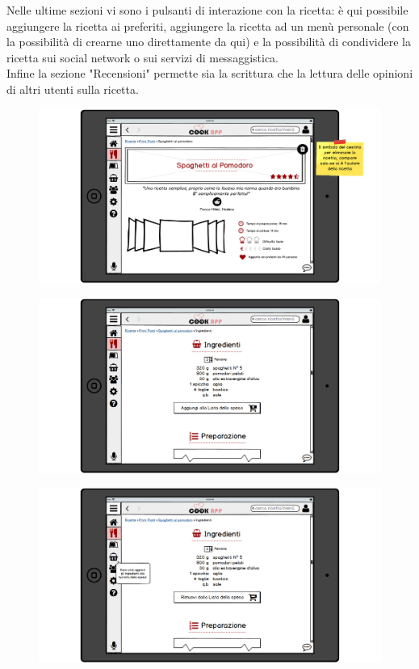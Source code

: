 Nelle ultime sezioni vi sono i pulsanti di interazione con la ricetta: è qui possibile aggiungere la ricetta ai preferiti, aggiungere la ricetta ad un menù personale (con la possibilità di crearne uno direttamente da qui) e la possibilità di condividere la ricetta sui social network o sui servizi di messaggistica.\\
Infine la sezione "Recensioni" permette sia la scrittura che la lettura delle opinioni di altri utenti sulla ricetta.\\
\begin{figure}[H]
	\centering
	\includegraphics[width=0.95\linewidth]{img/mockup/Ricetta.png}
\end{figure}
\begin{figure}[H]
	\centering
	\includegraphics[width=0.95\linewidth]{img/mockup/Ricetta2.png}
\end{figure}
\begin{figure}[H]
	\centering
	\includegraphics[width=0.95\linewidth]{img/mockup/Ricetta2-spesa.png}
\end{figure}

